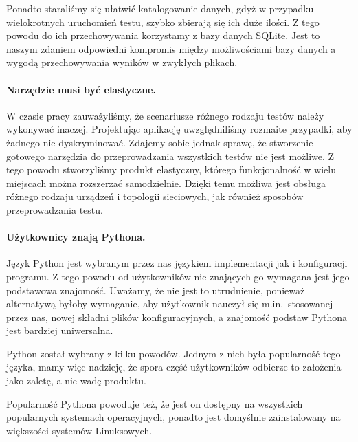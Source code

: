 \documentclass[00-praca-magisterska.tex]{subfiles}
\begin{document}
Ponadto staraliśmy się ułatwić katalogowanie danych, gdyż w przypadku
wielokrotnych uruchomień testu, szybko zbierają się ich duże ilości. Z tego
powodu do ich przechowywania korzystamy z bazy danych SQLite. Jest to naszym
zdaniem odpowiedni kompromis między możliwościami bazy danych a wygodą
przechowywania wyników w zwykłych plikach.

\paragraph{Narzędzie musi być elastyczne.} W czasie pracy zauważyliśmy, że
scenariusze różnego rodzaju testów należy wykonywać inaczej. Projektując
aplikację uwzględniliśmy rozmaite przypadki, aby żadnego nie dyskryminować.
Zdajemy sobie jednak sprawę, że stworzenie gotowego narzędzia do przeprowadzania
wszystkich testów nie jest możliwe. Z tego powodu stworzyliśmy produkt
elastyczny, którego funkcjonalność w wielu miejscach można rozszerzać
samodzielnie. Dzięki temu możliwa jest obsługa różnego rodzaju urządzeń i
topologii sieciowych, jak również sposobów przeprowadzania testu.

\paragraph{Użytkownicy znają Pythona.} Język Python jest wybranym przez nas
językiem implementacji jak i konfiguracji programu. Z tego powodu od
użytkowników nie znających go wymagana jest jego podstawowa znajomość. Uważamy,
że nie jest to utrudnienie, ponieważ alternatywą byłoby wymaganie, aby użytkownik
nauczył się m.in.~stosowanej przez nas, nowej składni plików konfiguracyjnych, a
znajomość podstaw Pythona jest bardziej uniwersalna.

Python został wybrany z kilku powodów. Jednym z nich była popularność tego
języka, mamy więc nadzieję, że spora część użytkowników odbierze to założenia
jako zaletę, a nie wadę produktu.

Popularność Pythona powoduje też, że jest on dostępny na wszystkich popularnych
systemach operacyjnych, ponadto jest domyślnie zainstalowany na większości
systemów Linuksowych.

\end{document}
